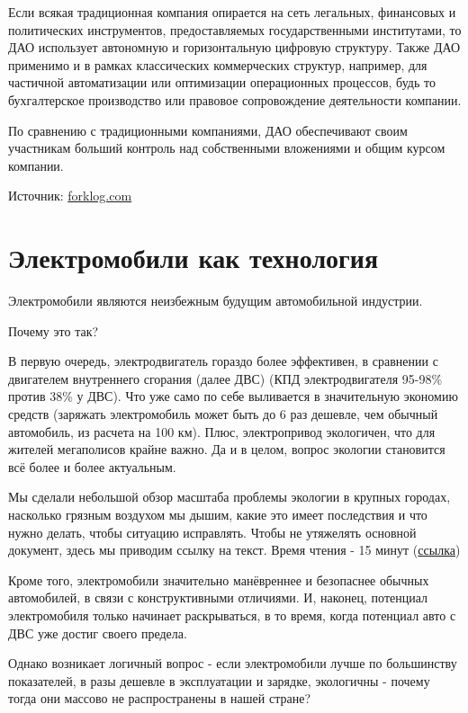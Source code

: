 \documentclass[a4paper,12pt]{report}
\begin{document}
Если всякая традиционная компания опирается на сеть легальных, финансовых и политических инструментов, предоставляемых государственными институтами, то ДАО использует автономную и горизонтальную цифровую структуру. Также ДАО применимо и в рамках классических коммерческих структур, например, для частичной автоматизации или оптимизации операционных процессов, будь то бухгалтерское производство или правовое сопровождение деятельности компании.

По сравнению с традиционными компаниями, ДАО обеспечивают своим участникам больший контроль над собственными вложениями и общим курсом компании.

Источник: \href{https://forklog.com/chto-takoe-detsentralizovannye-avtonomnye-organizatsii-i-zachem-oni-nuzhny/}{forklog.com}

\chapter{Электромобили как технология}
\label{chapter3}
Электромобили являются неизбежным будущим автомобильной индустрии. 

Почему это так? 

В первую очередь, электродвигатель гораздо более эффективен, в сравнении с двигателем внутреннего сгорания (далее ДВС) (КПД электродвигателя 95-98\% против 38\% у ДВС). Что уже само по себе выливается в значительную экономию средств (заряжать электромобиль может быть до 6 раз дешевле, чем обычный автомобиль, из расчета на 100 км). Плюс, электропривод экологичен, что для жителей мегаполисов крайне важно. Да и в целом, вопрос экологии становится всё более и более актуальным. 

Мы сделали небольшой обзор масштаба проблемы экологии в крупных городах, насколько грязным воздухом мы дышим, какие это имеет последствия и что нужно делать, чтобы ситуацию исправлять. Чтобы не утяжелять основной документ, здесь мы приводим ссылку на текст. Время чтения - 15 минут (\href{https://docs.google.com/document/d/1Xvn2jIdGmjOemTvSG5J-kHtrBBC3f-odBOGnE6IfGFw}{ссылка})

Кроме того, электромобили значительно манёвреннее и безопаснее обычных автомобилей, в связи с конструктивными отличиями. И, наконец, потенциал электромобиля только начинает раскрываться, в то время, когда потенциал авто с ДВС уже достиг своего предела. 

Однако возникает логичный вопрос - если электромобили лучше по большинству показателей, в разы дешевле в эксплуатации и зарядке, экологичны - почему тогда они массово не распространены в нашей стране? 
\end{document}
